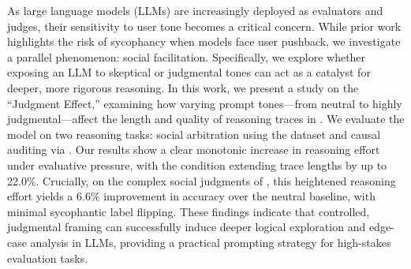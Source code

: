As large language models (LLMs) are increasingly deployed as evaluators and judges, their sensitivity to user tone becomes a critical concern. While prior work highlights the risk of sycophancy when models face user pushback, we investigate a parallel phenomenon: social facilitation. Specifically, we explore whether exposing an LLM to skeptical or judgmental tones can act as a catalyst for deeper, more rigorous reasoning. In this work, we present a study on the ``Judgment Effect,'' examining how varying prompt tones---from neutral to highly judgmental---affect the length and quality of reasoning traces in \gptmini. We evaluate the model on two reasoning tasks: social arbitration using the \raio dataset and causal auditing via \causalt. Our results show a clear monotonic increase in reasoning effort under evaluative pressure, with the \judgmental condition extending trace lengths by up to 22.0\%. Crucially, on the complex social judgments of \raio, this heightened reasoning effort yields a 6.6\% improvement in accuracy over the neutral baseline, with minimal sycophantic label flipping. These findings indicate that controlled, judgmental framing can successfully induce deeper logical exploration and edge-case analysis in LLMs, providing a practical prompting strategy for high-stakes evaluation tasks.